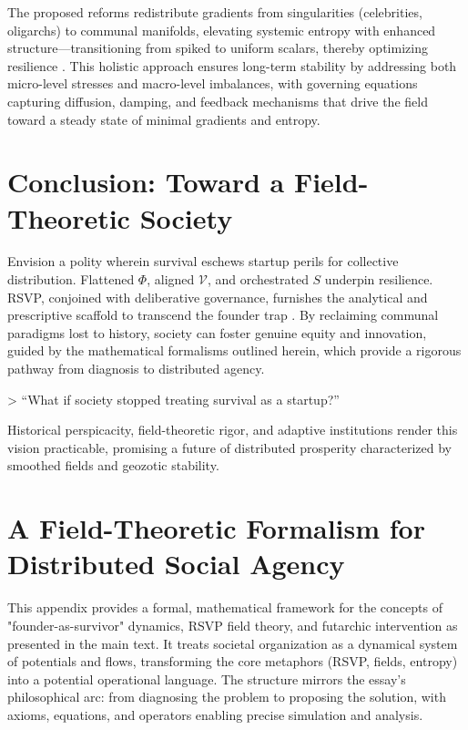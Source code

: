 \documentclass[11pt]{article}
\begin{document}
The proposed reforms redistribute gradients from singularities (celebrities, oligarchs) to communal manifolds, elevating systemic entropy with enhanced structure—transitioning from spiked to uniform scalars, thereby optimizing resilience \citep{gellmann1994quark, ostrom1990governing}. This holistic approach ensures long-term stability by addressing both micro-level stresses and macro-level imbalances, with governing equations capturing diffusion, damping, and feedback mechanisms that drive the field toward a steady state of minimal gradients and entropy.

\section{Conclusion: Toward a Field-Theoretic Society}

Envision a polity wherein survival eschews startup perils for collective distribution. Flattened $\Phi$, aligned $\mathcal{V}$, and orchestrated $S$ underpin resilience. RSVP, conjoined with deliberative governance, furnishes the analytical and prescriptive scaffold to transcend the founder trap \citep{giddens2006sociology}. By reclaiming communal paradigms lost to history, society can foster genuine equity and innovation, guided by the mathematical formalisms outlined herein, which provide a rigorous pathway from diagnosis to distributed agency.

> ``What if society stopped treating survival as a startup?''

Historical perspicacity, field-theoretic rigor, and adaptive institutions render this vision practicable, promising a future of distributed prosperity characterized by smoothed fields and geozotic stability.

\appendix

\section{A Field-Theoretic Formalism for Distributed Social Agency}

This appendix provides a formal, mathematical framework for the concepts of "founder-as-survivor" dynamics, RSVP field theory, and futarchic intervention as presented in the main text. It treats societal organization as a dynamical system of potentials and flows, transforming the core metaphors (RSVP, fields, entropy) into a potential operational language. The structure mirrors the essay's philosophical arc: from diagnosing the problem to proposing the solution, with axioms, equations, and operators enabling precise simulation and analysis.
\end{document}
